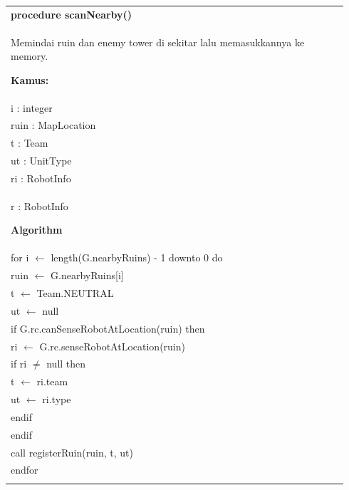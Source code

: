 \documentclass{article}
\newenvironment{pseudobox}
{
\centering
\begin{longtable}{|p{0.94\linewidth}|}
\hline
}
{
\\ \hline
\end{longtable}
\vspace{0.05cm}
}
\begin{document}
\begin{pseudobox}
\textbf{procedure scanNearby()} \\
{ Memindai ruin dan enemy tower di sekitar lalu memasukkannya ke memory. }

\textbf{Kamus:} \\
\hspace*{1em} i : integer \\
\hspace*{1em} ruin : MapLocation \\
\hspace*{1em} t : Team \\
\hspace*{1em} ut : UnitType \\
\hspace*{1em} ri : RobotInfo \\
\hspace*{1em} r : RobotInfo

\textbf{Algorithm} \\
\hspace*{1em} for i $\leftarrow$ length(G.nearbyRuins) - 1 downto 0 do \\
\hspace*{2em} ruin $\leftarrow$ G.nearbyRuins[i] \\
\hspace*{2em} t $\leftarrow$ Team.NEUTRAL \\
\hspace*{2em} ut $\leftarrow$ null \\
\hspace*{2em} if G.rc.canSenseRobotAtLocation(ruin) then \\
\hspace*{3em} ri $\leftarrow$ G.rc.senseRobotAtLocation(ruin) \\
\hspace*{3em} if ri $\neq$ null then \\
\hspace*{4em} t $\leftarrow$ ri.team \\
\hspace*{4em} ut $\leftarrow$ ri.type \\
\hspace*{3em} endif \\
\hspace*{2em} endif \\
\hspace*{2em} call registerRuin(ruin, t, ut) \\
\hspace*{1em} endfor \\


\end{pseudobox}
\end{document}
